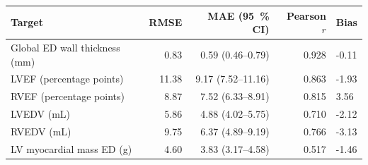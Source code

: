 \setcounter{table}{2}\label{tab:high_impact_transition_results}
\begin{tabularx}{\linewidth}{Xrrrl}
\toprule
Target & RMSE & MAE (95~\% CI) & Pearson \(r\) & Bias \\
\midrule
Global ED wall thickness (mm) & 0.83 & 0.59 (0.46--0.79) & 0.928 & -0.11 \\
LVEF (percentage points) & 11.38 & 9.17 (7.52--11.16) & 0.863 & -1.93 \\
RVEF (percentage points) & 8.87 & 7.52 (6.33--8.91) & 0.815 & 3.56 \\
LVEDV (mL) & 5.86 & 4.88 (4.02--5.75) & 0.710 & -2.12 \\
RVEDV (mL) & 9.75 & 6.37 (4.89--9.19) & 0.766 & -3.13 \\
LV myocardial mass ED (g) & 4.60 & 3.83 (3.17--4.58) & 0.517 & -1.46 \\
\bottomrule
\end{tabularx}
